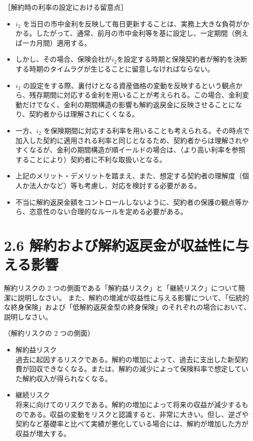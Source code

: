 \documentclass[report,gutter=10mm,fore-edge=10mm,uplatex,dvipdfmx]{jlreq}
\begin{document}
［解約時の利率の設定における留意点］
\begin{itemize}
 \item $i_2$ を当日の市中金利を反映して毎日更新することは、実務上大きな負荷がかかる。したがって、通常、前月の市中金利等を基に設定し、一定期間（例えば一カ月間）適用する。
 \item しかし、その場合、保険会社が$i_2$を設定する時期と保険契約者が解約を決断する時期のタイムラグが生じることに留意しなければならない。
 \item $i_2$ の設定をする際、裏付けとなる資産価格の変動を反映するという観点から、残存期間に対応する金利を用いることが考えられる。この場合、金利変動だけでなく、金利の期間構造の影響も解約返戻金に反映させることになり、契約者からは理解されにくくなる。
 \item 一方、$i_2$ を保険期間に対応する利率を用いることも考えられる。その時点で加入した契約に適用される利率と同じとなるため、契約者からは理解されやすくなるが、金利の期間構造が順イールドの場合は、（より高い利率を参照することにより）契約者に不利な取扱いとなる。
 \item 上記のメリット・デメリットを踏まえ、また、想定する契約者の理解度（個人か法人かなど）等も考慮し、対応を検討する必要がある。
 \item 不当に解約返戻金額をコントロールしないように、契約者の保護の観点等から、恣意性のない合理的なルールを定める必要がある。
\end{itemize}

\section{2.6 解約および解約返戻金が収益性に与える影響}


解約リスクの 2 つの側面である「解約益リスク」と「継続リスク」について簡潔に説明しなさい。
また、解約の増減が収益性に与える影響について、「伝統的な終身保険」および「低解約返戻金型の終身保険」のそれぞれの場合において、説明しなさい。


（解約リスクの 2 つの側面）
\begin{itemize}
 \item 解約益リスク\\
       過去に起因するリスクである。解約の増加によって、過去に支出した新契約費が回収できなくなる。または、解約の減少によって保険料率で想定していた解約収入が得られなくなる。   
 \item 継続リスク\\
       将来に向けてのリスクである。解約の増加によって将来の収益が減少するものである。収益の変動をリスクと認識すると、非常に大きい。但し、逆ざや契約など基礎率と比べて実績が悪化している場合には、解約が増加した方が収益が増大する。
\end{itemize}
\end{document}
